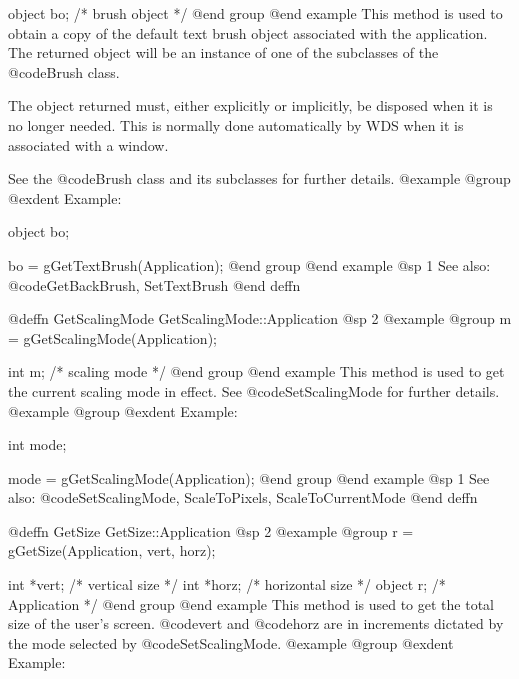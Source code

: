 object  bo;     /*  brush object  */
@end group
@end example
This method is used to obtain a copy of the default text brush object
associated with the application.  The returned object will be an
instance of one of the subclasses of the @code{Brush} class.

The object returned must, either explicitly or implicitly, be
disposed when it is no longer needed.  This is normally done
automatically by WDS when it is associated with a window.

See the @code{Brush} class and its subclasses for further details.
@example
@group
@exdent Example:

object  bo;

bo = gGetTextBrush(Application);
@end group
@end example
@sp 1
See also:  @code{GetBackBrush, SetTextBrush}
@end deffn















@deffn {GetScalingMode} GetScalingMode::Application
@sp 2
@example
@group
m = gGetScalingMode(Application);

int     m;      /*  scaling mode   */
@end group
@end example
This method is used to get the current scaling mode in effect.
See @code{SetScalingMode} for further details.
@example
@group
@exdent Example:

int     mode;

mode = gGetScalingMode(Application);
@end group
@end example
@sp 1
See also:  @code{SetScalingMode, ScaleToPixels, ScaleToCurrentMode}
@end deffn
















@deffn {GetSize} GetSize::Application
@sp 2
@example
@group
r = gGetSize(Application, vert, horz);

int    *vert;   /*  vertical size    */
int    *horz;   /*  horizontal size  */
object  r;      /*  Application      */
@end group
@end example
This method is used to get the total size of the user's screen.
@code{vert} and @code{horz} are in increments dictated by the
mode selected by @code{SetScalingMode}.  
@example
@group
@exdent Example:

